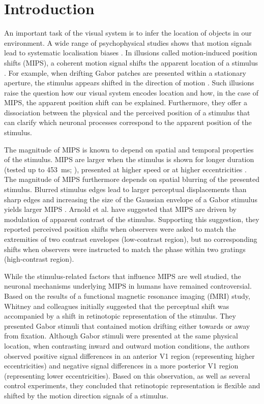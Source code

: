 \section{Introduction}
An important task of the visual system is to infer the location of objects in our environment. A wide range of psychophysical studies shows that motion signals lead to systematic localisation biases \parencite{Ramachandran1990, DeValois1991, Nishida1999, Fu2001, McGraw2002, Chung2007, Arnold2007, Eagleman2007, Kwon2015}. In illusions called motion-induced position shifts (MIPS), a coherent motion signal shifts the apparent location of a stimulus \parencite{Ramachandran1990}. For example, when drifting Gabor patches are presented within a stationary aperture, the stimulus appears shifted in the direction of motion \parencite{DeValois1991, Chung2007, Arnold2007}. Such illusions raise the question how our visual system encodes location and how, in the case of MIPS, the apparent position shift can be explained. Furthermore, they offer a dissociation between the physical and the perceived position of a stimulus that can clarify which neuronal processes correspond to the apparent position of the stimulus.

The magnitude of MIPS is known to depend on spatial and temporal properties of the stimulus. MIPS are larger when the stimulus is shown for longer duration (tested up to 453~ms; \cite{Chung2007}), presented at higher speed \parencite{Chung2007, Kwon2015} or at higher eccentricities \parencite{Fu2004, Chung2007, Kwon2015}. The magnitude of MIPS furthermore depends on spatial blurring of the presented stimulus. Blurred stimulus edges lead to larger perceptual displacements than sharp edges \parencite{Fu2001, Kwon2015} and increasing the size of the Gaussian envelope of a Gabor stimulus yields larger MIPS \parencite{Fu2001}. Arnold et al. \parencite*{Arnold2007} have suggested that MIPS are driven by modulation of apparent contrast of the stimulus. Supporting this suggestion, they reported perceived position shifts when observers were asked to match the extremities of two contrast envelopes (low-contrast region), but no corresponding shifts when observers were instructed to match the phase within two gratings (high-contrast region).

While the stimulus-related factors that influence MIPS are well studied, the neuronal mechanisms underlying MIPS in humans have remained controversial. Based on the results of a functional magnetic resonance imaging (fMRI) study, Whitney and colleagues \parencite*{Whitney2003} initially suggested that the perceptual shift was accompanied by a shift in retinotopic representation of the stimulus. They presented Gabor stimuli that contained motion drifting either towards or away from fixation. Although Gabor stimuli were presented at the same physical location, when contrasting inward and outward motion conditions, the authors observed positive signal differences in an anterior V1 region (representing higher eccentricities) and negative signal differences in a more posterior V1 region (representing lower eccentricities). Based on this observation, as well as several control experiments, they concluded that retinotopic representation is flexible and shifted by the motion direction signals of a stimulus.

